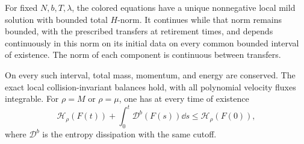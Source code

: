 \begin{proposition}
\label{con:finite-evolution}
For fixed \(N,b,T,\lambda\), the colored equations have a unique
nonnegative local mild solution with bounded total \(H\)-norm.  It
continues while that norm remains bounded, with the prescribed
transfers at retirement times, and depends continuously in this norm
on its initial data on every common bounded interval of existence.
The norm of each component is continuous between transfers.

On every such interval, total mass, momentum, and energy are conserved.
The exact local collision-invariant balances hold, with all polynomial
velocity fluxes integrable.  For \(\rho=M\) or \(\rho=\mu\), one has
at every time of existence
\begin{equation}
 \mathcal H_\rho(F(t))+
       \int_0^t\mathcal D^b(F(s))\dd s
       \le\mathcal H_\rho(F(0)),
 \label{con:finite-entropy}
\end{equation}
where \(\mathcal D^b\) is the entropy dissipation with the same cutoff.
\end{proposition}
